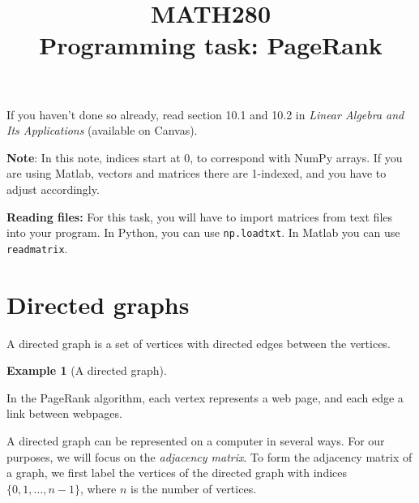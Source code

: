 \documentclass[a4paper]{scrartcl}
\title{MATH280\\ Programming task: PageRank}
\date{}
\theoremstyle{definition}
\newtheorem*{example}{Example}
\begin{document}
	\maketitle
	
	If you haven't done so already, read section 10.1 and 10.2 in \emph{Linear Algebra and Its Applications} (available on Canvas).
	
	\textbf{Note}: In this note, indices start at 0, to correspond with NumPy arrays. If you are using Matlab, vectors and matrices there are 1-indexed, and you have to adjust accordingly.
	
	\textbf{Reading files:}
	For this task, you will have to import matrices from text files into your program. In Python, you can use \texttt{np.loadtxt}. In Matlab you can use \texttt{readmatrix}.
	
	\section{Directed graphs}
	A directed graph is a set of vertices with directed edges between the vertices.
	\begin{example}[A directed graph]
	\phantom{x}\\
	\end{example}
	In the PageRank algorithm, each vertex represents a web page, and each edge a link between webpages.
	
	A directed graph can be represented on a computer in several ways. For our purposes, we will focus on the \emph{adjacency matrix}. To form the adjacency matrix of a graph, we first label the vertices of the directed graph with indices  $\{0,1,\dotsc, n-1\}$, where $n$ is the number of vertices.
	
\end{document}
